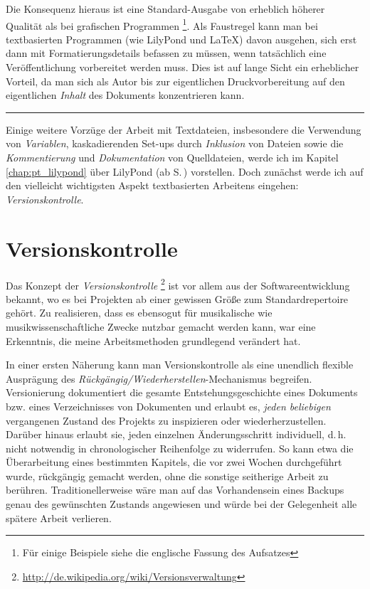 \documentclass[DIV=12]{scrreprt}
\begin{document}
Die Konsequenz hieraus ist eine Standard-Ausgabe von erheblich höherer Qualität als bei grafischen Programmen%
\footnote{Für einige Beispiele siehe die englische Fassung des Aufsatzes}.
Als Faustregel kann man bei textbasierten Programmen (wie LilyPond und \LaTeX) davon ausgehen, sich erst dann mit Formatierungsdetails befassen zu müssen, wenn tatsächlich eine Veröffentlichung vorbereitet werden muss.
Dies ist auf lange Sicht ein erheblicher Vorteil, da man sich als Autor bis zur eigentlichen Druckvorbereitung auf den eigentlichen \emph{Inhalt} des Dokuments konzentrieren kann.

\bigskip
\hrule
\bigskip

Einige weitere Vorzüge der Arbeit mit Textdateien, insbesondere die Verwendung von \emph{Variablen}, kaskadierenden Set-ups durch \emph{Inklusion} von Dateien sowie die \emph{Kommentierung} und \emph{Dokumentation} von Quelldateien, werde ich im Kapitel \ref{chap:pt_lilypond} über LilyPond (ab S.\,\pageref{chap:pt_lilypond}) vorstellen.
Doch zunächst werde ich auf den vielleicht wichtigsten Aspekt textbasierten Arbeitens eingehen: \emph{Versionskontrolle}.

\chapter{Versionskontrolle}
\label{chap:pt_version-control}
Das Konzept der \emph{Versionskontrolle}%
\footnote{\url{http://de.wikipedia.org/wiki/Versionsverwaltung}}
ist vor allem aus der Softwareentwicklung bekannt, wo es bei Projekten ab einer gewissen Größe zum Standardrepertoire gehört.
Zu realisieren, dass es ebensogut für musikalische wie musikwissenschaftliche Zwecke nutzbar gemacht werden kann, war eine Erkenntnis, die meine Arbeitsmethoden grundlegend verändert hat.

In einer ersten Näherung kann man Versionskontrolle als eine unendlich flexible Ausprägung des \emph{Rückgängig/Wiederherstellen}-Mechanismus begreifen.
Versionierung dokumentiert die gesamte Entstehungsgeschichte eines Dokuments bzw. eines Verzeichnisses von Dokumenten und erlaubt es, \emph{jeden beliebigen} vergangenen Zustand des Projekts zu inspizieren oder wiederherzustellen.
Darüber hinaus erlaubt sie, jeden einzelnen Änderungsschritt individuell, d.\,h. nicht notwendig in chronologischer Reihenfolge zu widerrufen.
So kann etwa die Überarbeitung eines bestimmten Kapitels, die vor zwei Wochen durchgeführt wurde, rückgängig gemacht werden, ohne die sonstige seitherige Arbeit zu berühren.
Traditionellerweise wäre man auf das Vorhandensein eines Backups genau des gewünschten Zustands angewiesen und würde bei der Gelegenheit alle spätere Arbeit verlieren.
\end{document}
